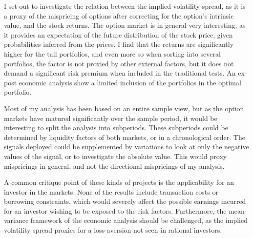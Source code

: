 I set out to investigate the relation between the implied volatility spread, as it is a proxy of the mispricing of options after correcting for the option's intrinsic value, and the stock returns. The option market is in general very interesting, as it provides an expectation of the future distribution of the stock price, given probabilities inferred from the prices. I find that the returns are significantly higher for the tail portfolios, and even more so when sorting into several portfolios, the factor is not proxied by other external factors, but it does not demand a significant risk premium when included in the traditional tests. An ex-post economic analysis show a limited inclusion of the portfolios in the optimal portfolio. 

Most of my analysis has been based on an entire sample view, but as the option markets have matured significantly over the sample period, it would be interesting to split the analysis into subperiods. These subperiods could be determined by liquidity factors of both markets, or in a chronological order. The signals deployed could be supplemented by variations to look at only the negative values of the signal, or to investigate the absolute value. This would proxy mispricings in general, and not the directional mispricings of my analysis. 

A common critique point of these kinds of projects is the applicability for an investor in the markets. None of the results include transaction costs or borrowing constraints, which would severely affect the possible earnings incurred for an investor wishing to be exposed to the risk factors. Furthermore, the mean-variance framework of the economic analysis should be challenged, as the implied volatility spread proxies for a loss-aversion not seen in rational investors.%

\vspace*{6mm}




